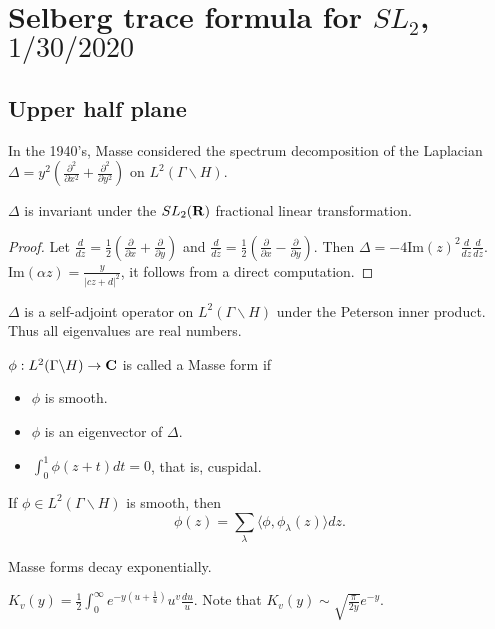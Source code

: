 \documentclass[../main.tex]{subfiles}
\begin{document}
\section{Selberg trace formula for $SL_{2}$, $1/30/2020$}
\subsection{Upper half plane}
In the 1940's, Masse considered the spectrum decomposition of the Laplacian $\Delta = y^{2}(\frac{\partial^{2}}{\partial x^{2}}+\frac{\partial^{2}}{\partial y^{2}})$ on $L^{2}(\Gamma\backslash H)$.
\begin{proposition}
$\Delta$ is invariant under the $SL_{2}(\mathbf{R})$ fractional linear transformation. 
\end{proposition}
\begin{proof}
Let $\frac{d}{dz}=\frac{1}{2}(\frac{\partial }{\partial x}+\frac{\partial}{\partial y})$ and $\frac{d}{d\overline{z}}=\frac{1}{2}(\frac{\partial }{\partial x}-\frac{\partial}{\partial y})$. Then $\Delta = -4 \mathrm{Im}(z)^{2}\frac{d}{dz}\frac{d}{d\overline{z}}$. $\mathrm{Im}(\alpha z)=\frac{y}{|cz+d|^{2}}$, it follows from a direct computation.
\end{proof}
\begin{proposition}
$\Delta$ is a self-adjoint operator on $L^{2}(\Gamma\backslash H)$ under the Peterson inner product. Thus all eigenvalues are real numbers.
\end{proposition}
\begin{definition}
$\phi:L^{2}(\Gamma\backslash H)\rightarrow \mathbf{C}$ is called a Masse form if 
\begin{itemize}
    \item $\phi$ is smooth.
    \item $\phi$ is an eigenvector of $\Delta$.
    \item $\int_{0}^{1}\phi(z+t)dt=0$, that is, cuspidal.
\end{itemize}
\end{definition}
\begin{theorem}
If $\phi\in L^{2}(\Gamma\backslash H)$ is smooth, then 
$$\phi(z)=\sum_{\lambda}\langle \phi, \phi_{\lambda}(z)\rangle dz.$$
\end{theorem}
\begin{remark}
Masse forms decay exponentially. 
\end{remark}
\begin{definition}
$K_{v}(y)=\frac{1}{2}\int_{0}^{\infty}e^{-y(u+\frac{1}{u})}u^{v}\frac{du}{u}$. Note that $K_{v}(y)\sim \sqrt{\frac{\pi}{2y}}e^{-y}$.
\end{definition}
\end{document}
